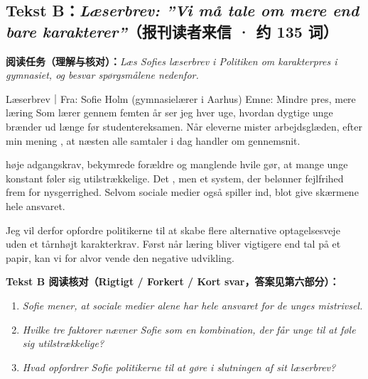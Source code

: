 \subsection*{Tekst B：\textit{Læserbrev: ”Vi må tale om mere end bare karakterer”}（报刊读者来信 · 约 135 词）}

\textbf{阅读任务（理解与核对）：}\textit{Læs Sofies læserbrev i Politiken om karakterpres i gymnasiet, og besvar spørgsmålene nedenfor.}

\begin{emailbox}{Læserbrev｜Fra: Sofie Holm (gymnasielærer i Aarhus) \quad Emne: Mindre pres, mere læring}
Som lærer gennem femten år ser jeg hver uge, hvordan dygtige unge brænder ud længe før studentereksamen. Når eleverne mister arbejdsglæden,  efter min mening , at næsten alle samtaler i dag handler om gennemsnit.

 høje adgangskrav, bekymrede forældre og manglende hvile gør, at mange unge konstant føler sig utilstrækkelige. Det , men et system, der belønner fejlfrihed frem for nysgerrighed. Selvom sociale medier også spiller ind,  blot give skærmene hele ansvaret.

Jeg vil derfor opfordre politikerne til at skabe flere alternative optagelsesveje uden et tårnhøjt karakterkrav. Først når læring bliver vigtigere end tal på et papir, kan vi for alvor vende den negative udvikling.
\end{emailbox}

\textbf{Tekst B 阅读核对（Rigtigt / Forkert / Kort svar，答案见第六部分）：}
\begin{enumerate}
  \item \textit{Sofie mener, at sociale medier alene har hele ansvaret for de unges mistrivsel.} \underline{\hspace{2.2cm}}
  \item \textit{Hvilke tre faktorer nævner Sofie som en kombination, der får unge til at føle sig utilstrækkelige?} \underline{\hspace{2.2cm}}
  \item \textit{Hvad opfordrer Sofie politikerne til at gøre i slutningen af sit læserbrev?} \underline{\hspace{2.2cm}}
\end{enumerate}

